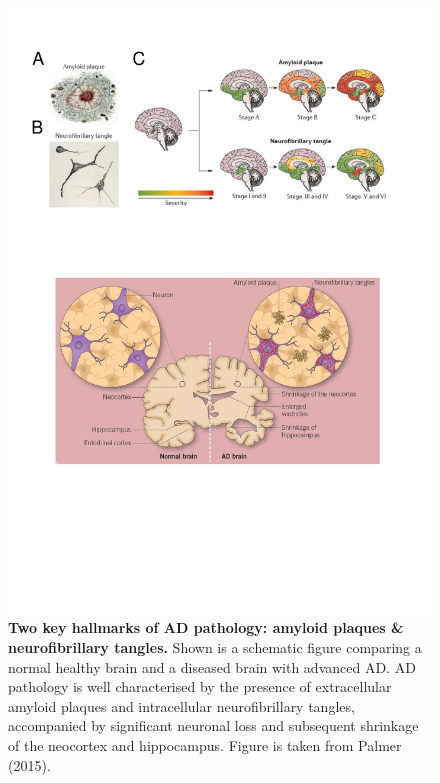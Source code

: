 \vspace{0.5cm}
\begin{figure}[!ht]
	\centering
	\includegraphics[page=1,trim={0 7cm 1cm 13cm},clip, scale = 0.75]{Figures/Introduction_Figures.pdf}
	\captionsetup{width=0.95\textwidth,singlelinecheck=off}
	\caption[Two key hallmarks of AD pathology: amyloid plaques \& neurofibrillary tangles]%
	{\textbf{Two key hallmarks of AD pathology: amyloid plaques \& neurofibrillary tangles.} Shown is a schematic figure comparing a normal healthy brain and a diseased brain with advanced AD. AD pathology is well characterised by the presence of extracellular amyloid plaques and intracellular neurofibrillary tangles, accompanied by significant neuronal loss and subsequent shrinkage of the neocortex and hippocampus. Figure is taken from Palmer (2015)\cite{AlanM.Palmer2015}.
	}
	\label{fig:AD_intro}
\end{figure} 

